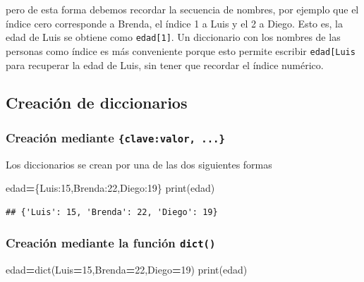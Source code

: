 \documentclass[
]{book}
\newenvironment{Shaded}{\begin{snugshade}}{\end{snugshade}}
\newcommand{\BuiltInTok}[1]{#1}
\newcommand{\DecValTok}[1]{\textcolor[rgb]{0.00,0.00,0.81}{#1}}
\newcommand{\NormalTok}[1]{#1}
\newcommand{\OperatorTok}[1]{\textcolor[rgb]{0.81,0.36,0.00}{\textbf{#1}}}
\newcommand{\StringTok}[1]{\textcolor[rgb]{0.31,0.60,0.02}{#1}}
\theoremstyle{definition}
\theoremstyle{definition}
\theoremstyle{definition}
\theoremstyle{definition}
\theoremstyle{remark}
\begin{document}
pero de esta forma debemos recordar la secuencia de nombres, por ejemplo que el índice cero corresponde a Brenda, el índice 1 a Luis y el 2 a Diego. Esto es, la edad de Luis se obtiene como \texttt{edad{[}1{]}}. Un diccionario con los nombres de las personas como índice es más conveniente porque esto permite escribir \texttt{edad{[}\textquotesingle{}Luis\textquotesingle{}{]}} para recuperar la edad de Luis, sin tener que recordar el índice numérico.

\hypertarget{creaciuxf3n-de-diccionarios}{%
\subsection{Creación de diccionarios}\label{creaciuxf3n-de-diccionarios}}

\hypertarget{creaciuxf3n-mediante-clavevalor-...}{%
\subsubsection{\texorpdfstring{Creación mediante \texttt{\{clave:valor,\ ...\}}}{Creación mediante \{clave:valor, ...\}}}\label{creaciuxf3n-mediante-clavevalor-...}}

Los diccionarios se crean por una de las dos siguientes formas

\begin{Shaded}
\begin{Highlighting}[]
\NormalTok{edad}\OperatorTok{=}\NormalTok{\{}\StringTok{\textquotesingle{}Luis\textquotesingle{}}\NormalTok{:}\DecValTok{15}\NormalTok{,}\StringTok{\textquotesingle{}Brenda\textquotesingle{}}\NormalTok{:}\DecValTok{22}\NormalTok{,}\StringTok{\textquotesingle{}Diego\textquotesingle{}}\NormalTok{:}\DecValTok{19}\NormalTok{\}}
\BuiltInTok{print}\NormalTok{(edad)}
\end{Highlighting}
\end{Shaded}

\begin{verbatim}
## {'Luis': 15, 'Brenda': 22, 'Diego': 19}
\end{verbatim}

\hypertarget{creaciuxf3n-mediante-la-funciuxf3n-dict}{%
\subsubsection{\texorpdfstring{Creación mediante la función \texttt{dict()}}{Creación mediante la función dict()}}\label{creaciuxf3n-mediante-la-funciuxf3n-dict}}

\begin{Shaded}
\begin{Highlighting}[]
\NormalTok{edad}\OperatorTok{=}\BuiltInTok{dict}\NormalTok{(Luis}\OperatorTok{=}\DecValTok{15}\NormalTok{,Brenda}\OperatorTok{=}\DecValTok{22}\NormalTok{,Diego}\OperatorTok{=}\DecValTok{19}\NormalTok{) }
\BuiltInTok{print}\NormalTok{(edad)}
\end{Highlighting}
\end{Shaded}
\end{document}
